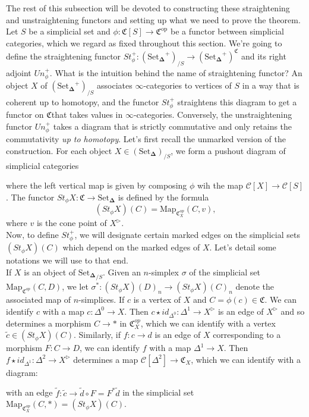 \documentclass[12pt]{amsart}
\newcommand{\8}{\ensuremath{\infty}}
\newcommand{\C}{\ensuremath{\mathfrak{C}}}
\newcommand{\SSet}{\ensuremath{\text{Set}_{\boldsymbol{\Delta}}}}
\newcommand{\op}[1]{\ensuremath{{#1}^{\text{op}}}}
\newcommand{\Map}{\ensuremath{\text{Map}}}
\begin{document}
{{The rest of this subsection will be devoted to constructing these straightening and unstraightening functors and setting up what we need to prove the theorem.\\
Let $S$ be a simplicial set and $\phi: \mathfrak{C}[S] \rightarrow \op\C$ be a functor between simplicial categories, which we regard as fixed throughout this section. We're going to define the straightening functor $St_\phi^+: (\SSet^+)_{/S} \rightarrow (\SSet^+)^\C$ and its right adjoint $Un_\phi^+$. What is the intuition behind the name of straightening functor? An object $X$ of $(\SSet^+)_{/S}$ associates \8-categories to vertices of $S$ in a way that is coherent up to homotopy, and the functor $St_\phi^+$ straightens this diagram to get a functor on \C that takes values in \8-categories. Conversely, the unstraightening functor $Un_\phi^+$ takes a diagram that is strictly commutative and only retains the commutativity \emph{up to homotopy}.
Let's first recall the unmarked version of the construction. For each object $X\in(\SSet)_{/S}$, we form a pushout diagram of simplicial categories
where the left vertical map is given by composing $\phi$ wih the map $\mathscr{C}[X]\rightarrow \mathscr{C}[S]$. The functor $St_\phi X: \C\rightarrow \SSet$ is defined by the formula
\[(St_\phi X)(C) = \Map_{\C^{op}_X}(C,v),\] where $v$ is the cone point of $X^\triangleright$.\\
Now, to define $St_\phi^+$, we will designate certain marked edges on the simplicial sets $(St_\phi X)(C)$ which depend on the marked edges of $X$. Let's detail some notations we will use to that end. \\
If $X$ is an object of ${\SSet}_{/S}$. Given an $n$-simplex $\sigma$ of the simplicial set $\Map_{\C^{op}}(C,D)$, we let $\sigma^*:(St_\phi X)(D)_n \rightarrow (St_\phi X)(C)_n$ denote the associated map of $n$-simplices. If $c$ is a vertex of $X$ and $C = \phi(c)\in\C$. We can identify $c$ with a map $c:\Delta^0\rightarrow X$. Then $c\star id_{\Delta^0}:\Delta^1\rightarrow X^\triangleright$ is an edge of $X^\triangleright$ and so determines a morphism $C\rightarrow *$ in $\C^{op}_X$, which we can identify with a vertex $\tilde{c}\in(St_\phi X)(C)$. Similarly, if $f:c\rightarrow d$ is an edge of $X$ corresponding to a morphism $F:C\rightarrow D$, we can identify $f$ with a map $\Delta^1\rightarrow X$. Then $f\star id_{\Delta^1}:\Delta^2 \rightarrow X^\triangleright$ determines a map $\mathscr{C}[\Delta^2]\rightarrow \C_X$, which we can identify with a diagram:
with an edge $\tilde{f}:\tilde{c}\rightarrow \tilde{d}\circ F = F^*\tilde{d}$ in the simplicial set $\Map_{\C^{op}_X}(C,*) = (St_\phi X)(C).$

}}
\end{document}
